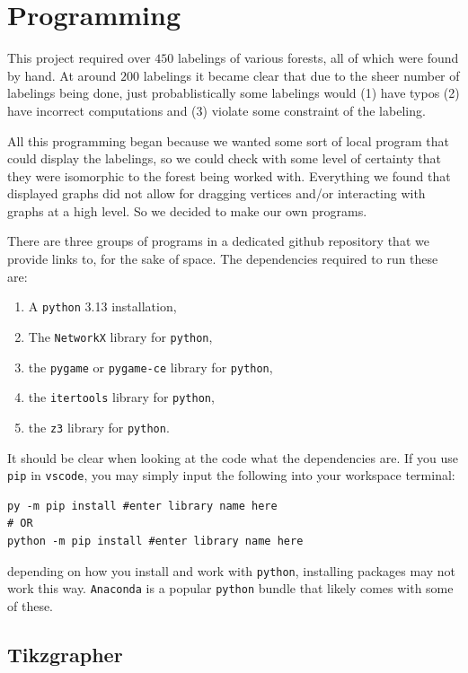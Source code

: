 \chapter{Programming}\label{chap:programming}
This project required over $450$ labelings of various forests, all of which were found by hand. At around $200$ labelings it became clear that due to the sheer number of labelings being done, just probablistically some labelings would (1) have typos (2) have incorrect computations and (3) violate some constraint of the labeling.

All this programming began because we wanted some sort of local program that could display the labelings, so we could check with some level of certainty that they were isomorphic to the forest being worked with. Everything we found that displayed graphs did not allow for dragging vertices and/or interacting with graphs at a high level. So we decided to make our own programs.

There are three groups of programs in a dedicated github repository that we provide links to, for the sake of space. The dependencies required to run these are:

\begin{enumerate}
  \item A \verb|python| 3.13 installation,
  \item The \verb|NetworkX| library for \verb|python|,
  \item the \verb|pygame| or \verb|pygame-ce| library for \verb|python|,
  \item the \verb|itertools| library for \verb|python|,
  \item the \verb|z3| library for \verb|python|.
\end{enumerate}
It should be clear when looking at the code what the dependencies are. If you use \verb|pip| in \verb|vscode|, you may simply input the following into your workspace terminal: 
\begin{verbatim}
py -m pip install #enter library name here
# OR
python -m pip install #enter library name here
\end{verbatim}
depending on how you install and work with \verb|python|, installing packages may not work this way. \verb|Anaconda| is a popular \verb|python| bundle that likely comes with some of these.

\section{Tikzgrapher}

